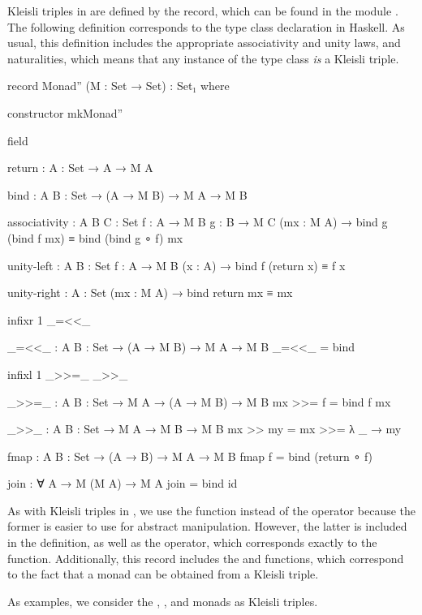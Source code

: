 Kleisli triples in \agda are defined by the  record,
which can be found in the module . The
following definition corresponds to the  type class
declaration in Haskell. As usual, this definition includes the
appropriate associativity and unity laws, and naturalities, which
means that any instance of the  type class \emph{is} a
Kleisli triple.
\begin{codeagda}
record Monad'' (M : Set → Set) : Set₁ where

  constructor mkMonad''

  field

    return : {A : Set} → A → M A

    bind   : {A B : Set} → (A → M B) → M A → M B

    associativity : {A B C : Set} {f : A → M B} {g : B → M C}
                    (mx : M A) →
                    bind g (bind f mx) ≡ bind (bind g ∘ f) mx

    unity-left    : {A B : Set} {f : A → M B} (x : A) →
                    bind f (return x) ≡ f x

    unity-right   : {A : Set} (mx : M A) → bind return mx ≡ mx

  infixr 1 _=<<_

  _=<<_ : {A B : Set} → (A → M B) → M A → M B
  _=<<_ = bind

  infixl 1 _>>=_ _>>_

  _>>=_ : {A B : Set} → M A → (A → M B) → M B
  mx >>= f = bind f mx

  _>>_ : {A B : Set} → M A → M B → M B
  mx >> my = mx >>= λ _ → my

  fmap : {A B : Set} → (A → B) → M A → M B
  fmap f = bind (return ∘ f)

  join : ∀ {A} → M (M A) → M A
  join = bind id
\end{codeagda}
As with Kleisli triples in \hask, we use the  function
instead of the \textagda{\_>>=\_} operator because the former is
easier to use for abstract manipulation. However, the latter is
included in the definition, as well as the \textagda{\_=<<\_}
operator, which corresponds exactly to the  function.
Additionally, this record includes the  and
 functions, which correspond to the fact that a monad
can be obtained from a Kleisli triple.

As examples, we consider the , ,
and  monads as Kleisli triples.

